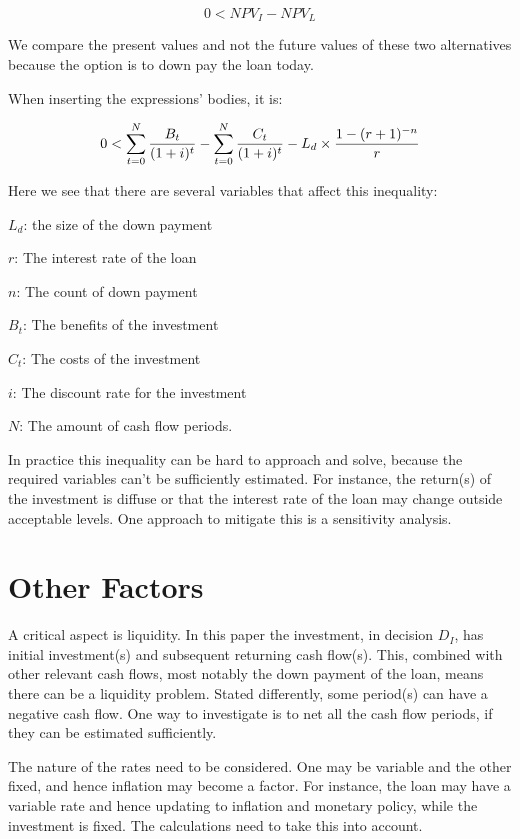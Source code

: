 \documentclass[a4paper]{article}
\begin{document}
\begin{equation}
0 < NPV_I - NPV_L
\end{equation}

We compare the present values and not the future values of these two
alternatives because the option is to down pay the loan today.

When inserting the expressions' bodies, it is:

\begin{equation}
0 < \NPV_I - \NPVL
\end{equation}

Here we see that there are several variables that affect this inequality:

$L_d$: the size of the down payment

$r$: The interest rate of the loan

$n$: The count of down payment

$B_t$: The benefits of the investment

$C_t$: The costs of the investment

$i$: The discount rate for the investment

$N$: The amount of cash flow periods.

In practice this inequality can be hard to approach and solve, because the
required variables can't be sufficiently estimated. For instance, the return(s)
of the investment is diffuse or that the interest rate of the loan may change
outside acceptable levels. One approach to mitigate this is a sensitivity
analysis.

\section{Other Factors}

A critical aspect is liquidity. In this paper the investment, in decision $D_I$,
has initial investment(s) and subsequent returning cash flow(s). This, combined
with other relevant cash flows, most notably the down payment of the loan, means
there can be a liquidity problem. Stated differently, some period(s) can have a
negative cash flow. One way to investigate is to net all the cash flow periods,
if they can be estimated sufficiently.

The nature of the rates need to be considered. One may be variable and the other
fixed, and hence inflation may become a factor. For instance, the loan may have
a variable rate and hence updating to inflation and monetary policy, while the
investment is fixed. The calculations need to take this into account.
\end{document}
